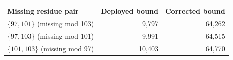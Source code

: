 \begin{tabular}{lrr}
\toprule
Missing residue pair & Deployed bound & Corrected bound \\
\midrule
$\{97,101\}$ (missing mod 103) & 9,797 & 64,262 \\
$\{97,103\}$ (missing mod 101) & 9,991 & 64,515 \\
$\{101,103\}$ (missing mod 97) & 10,403 & 64,770 \\
\bottomrule
\end{tabular}